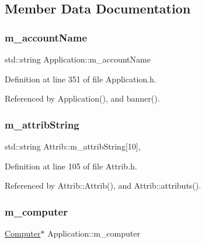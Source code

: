 \subsection{Member Data Documentation}
\mbox{\label{classApplication_ac6ecd97be07092147986a7a5965c54ec}} 
\subsubsection{\texorpdfstring{m\+\_\+account\+Name}{m\_accountName}}
{\footnotesize\ttfamily std\+::string Application\+::m\+\_\+account\+Name\hspace{0.3cm}{\ttfamily [protected]}}



Definition at line 351 of file Application.\+h.



Referenced by Application(), and banner().

\mbox{\label{classAttrib_a3414521d7a82476e874b25a5407b5e63}} 
\subsubsection{\texorpdfstring{m\+\_\+attrib\+String}{m\_attribString}}
{\footnotesize\ttfamily std\+::string Attrib\+::m\+\_\+attrib\+String\mbox{[}10\mbox{]}\hspace{0.3cm}{\ttfamily [protected]}, {\ttfamily [inherited]}}



Definition at line 105 of file Attrib.\+h.



Referenced by Attrib\+::\+Attrib(), and Attrib\+::attributs().

\mbox{\label{classApplication_a17c9fd27b6abbc18abb6d5de5d7648ef}} 
\subsubsection{\texorpdfstring{m\+\_\+computer}{m\_computer}}
{\footnotesize\ttfamily \hyperlink{classComputer}{Computer}$\ast$ Application\+::m\+\_\+computer\hspace{0.3cm}{\ttfamily [private]}}



